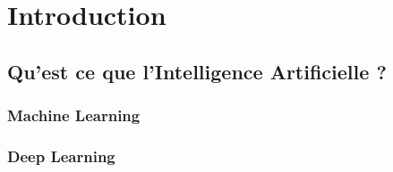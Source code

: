 \chapter{Introduction}
\section{Qu'est ce que l'Intelligence Artificielle ?}
\subsection{Machine Learning}

\subsection{Deep Learning}
